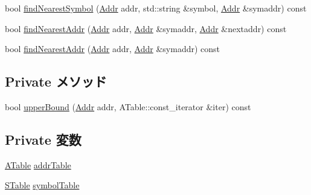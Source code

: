 \begin{DoxyCompactItemize}
\item 
bool \hyperlink{classSymbolTable_a92050be34461e2a753aec9fc9df50d64}{findNearestSymbol} (\hyperlink{base_2types_8hh_af1bb03d6a4ee096394a6749f0a169232}{Addr} addr, std::string \&symbol, \hyperlink{base_2types_8hh_af1bb03d6a4ee096394a6749f0a169232}{Addr} \&symaddr) const 
\item 
bool \hyperlink{classSymbolTable_a7495ab63f39dbd30ffac2d4fc219e227}{findNearestAddr} (\hyperlink{base_2types_8hh_af1bb03d6a4ee096394a6749f0a169232}{Addr} addr, \hyperlink{base_2types_8hh_af1bb03d6a4ee096394a6749f0a169232}{Addr} \&symaddr, \hyperlink{base_2types_8hh_af1bb03d6a4ee096394a6749f0a169232}{Addr} \&nextaddr) const 
\item 
bool \hyperlink{classSymbolTable_ae1f88ba313684b4be515c914b7b14411}{findNearestAddr} (\hyperlink{base_2types_8hh_af1bb03d6a4ee096394a6749f0a169232}{Addr} addr, \hyperlink{base_2types_8hh_af1bb03d6a4ee096394a6749f0a169232}{Addr} \&symaddr) const 
\end{DoxyCompactItemize}
\subsection*{Private メソッド}
\begin{DoxyCompactItemize}
\item 
bool \hyperlink{classSymbolTable_a31fc93d64da60991f0126e0001eddbe0}{upperBound} (\hyperlink{base_2types_8hh_af1bb03d6a4ee096394a6749f0a169232}{Addr} addr, ATable::const\_\-iterator \&iter) const 
\end{DoxyCompactItemize}
\subsection*{Private 変数}
\begin{DoxyCompactItemize}
\item 
\hyperlink{classSymbolTable_a774a5b092c28960e65c8301f26a0bf88}{ATable} \hyperlink{classSymbolTable_a4be159a25acfb2f92b2504ddde718ac3}{addrTable}
\item 
\hyperlink{classSymbolTable_ad1bd5f7577278d0dd7a1b10fe53e8d9e}{STable} \hyperlink{classSymbolTable_ab9b42e61946f386ede84d40320270925}{symbolTable}
\end{DoxyCompactItemize}


